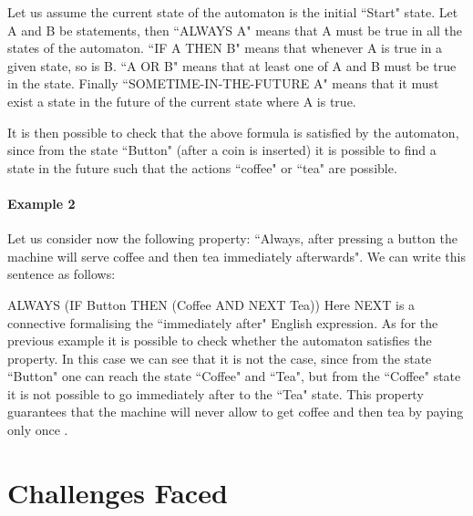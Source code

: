 \documentclass[a4paper,10pt]{report}
\begin{document}
Let us assume the current state of the automaton is the initial ``Start" state. Let A and B be statements, then ``ALWAYS A" means that A must be true in all the states of the automaton. ``IF A THEN B" means that whenever A is true in a given state, so is B. ``A OR B" means that at least one of A and B must be true in the state. Finally ``SOMETIME-IN-THE-FUTURE A" means that it must exist a state in the future of the current state where A is true.

It is then possible to check that the above formula is satisfied by the automaton, since from the state ``Button" (after a coin is inserted) it is possible to find a state in the future such that the actions ``coffee" or ``tea" are possible.
\paragraph{Example 2}
Let us consider now the following property: ``Always, after pressing a button the machine will serve coffee and then tea immediately afterwards". We can write this sentence as follows:

ALWAYS (IF Button THEN (Coffee AND NEXT Tea))
Here NEXT is a connective formalising the ``immediately after" English expression. As for the previous example it is possible to check whether the automaton satisfies the property. In this case we can see that it is not the case, since from the state ``Button" one can reach the state ``Coffee" and ``Tea", but from the ``Coffee" state it is not possible to go immediately after to the ``Tea" state. This property guarantees that the machine will never allow to get coffee and then tea by paying only once \cite{D.Jackson}.

\section{Challenges Faced}
\label{Challenges faced}
\end{document}
